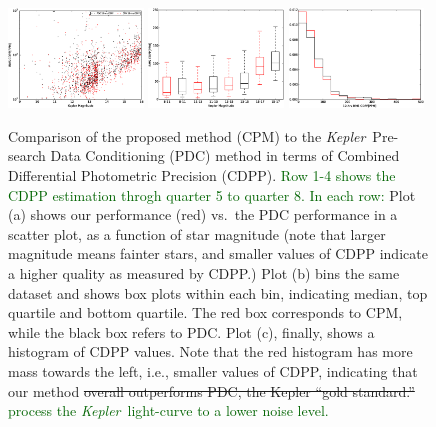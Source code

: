 \documentclass[12pt, preprint]{aastex}
\newcommand{\project}[1]{\textsl{#1}}
\newcommand{\Kepler}{\project{Kepler}}
\newcommand{\name}{CPM}
\newcommand{\revise}[1]{\textcolor{darkgreen}{#1}}
\newcommand{\remove}[1]{\sout{#1}}
\begin{document}
\begin{figure}[p]
\begin{center}
\includegraphics[width=0.32\textwidth]{f6j}
\includegraphics[width=0.32\textwidth]{f6k}
\includegraphics[width=0.32\textwidth]{f6l}
\end{center}
\caption{
  \label{cdpp} 
  Comparison of the proposed method (\name) to the \Kepler\ Pre-search Data Conditioning (PDC) method 
    in terms of Combined Differential Photometric Precision (CDPP).
  \revise{Row 1-4 shows the CDPP estimation throgh quarter 5 to quarter 8. In each row:} 
  Plot (a) shows our performance (red) vs.\ the PDC performance in a scatter plot, as a function of star magnitude 
    (note that larger magnitude means fainter stars, 
    and smaller values of CDPP indicate a higher quality as measured by CDPP.)
  Plot (b) bins the same dataset and shows box plots within each bin, 
    indicating median, top quartile and bottom quartile. 
  The red box corresponds to \name, while the black box refers to PDC. 
  Plot (c), finally, shows a histogram of CDPP values. 
  Note that the red histogram has more mass towards the left, i.e., smaller values of CDPP, 
    indicating that our method \remove{overall outperforms PDC, the Kepler ``gold standard.'' } \revise{process the \Kepler\ light-curve to a lower noise level.}
}
\end{figure}
\end{document}
